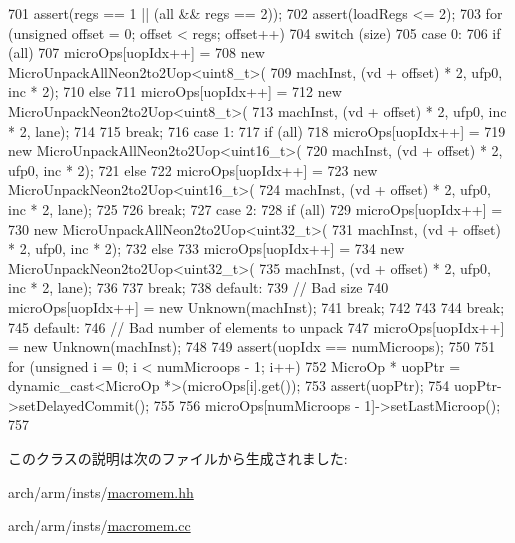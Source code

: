 \begin{DoxyCode}
{{701         assert(regs == 1 || (all && regs == 2));
702         assert(loadRegs <= 2);
703         for (unsigned offset = 0; offset < regs; offset++) {
704             switch (size) {
705               case 0:
706                 if (all) {
707                     microOps[uopIdx++] =
708                         new MicroUnpackAllNeon2to2Uop<uint8_t>(
709                             machInst, (vd + offset) * 2, ufp0, inc * 2);
710                 } else {
711                     microOps[uopIdx++] =
712                         new MicroUnpackNeon2to2Uop<uint8_t>(
713                             machInst, (vd + offset) * 2, ufp0, inc * 2, lane);
714                 }
715                 break;
716               case 1:
717                 if (all) {
718                     microOps[uopIdx++] =
719                         new MicroUnpackAllNeon2to2Uop<uint16_t>(
720                             machInst, (vd + offset) * 2, ufp0, inc * 2);
721                 } else {
722                     microOps[uopIdx++] =
723                         new MicroUnpackNeon2to2Uop<uint16_t>(
724                             machInst, (vd + offset) * 2, ufp0, inc * 2, lane);
725                 }
726                 break;
727               case 2:
728                 if (all) {
729                     microOps[uopIdx++] =
730                         new MicroUnpackAllNeon2to2Uop<uint32_t>(
731                             machInst, (vd + offset) * 2, ufp0, inc * 2);
732                 } else {
733                     microOps[uopIdx++] =
734                         new MicroUnpackNeon2to2Uop<uint32_t>(
735                             machInst, (vd + offset) * 2, ufp0, inc * 2, lane);
736                 }
737                 break;
738               default:
739                 // Bad size
740                 microOps[uopIdx++] = new Unknown(machInst);
741                 break;
742             }
743         }
744         break;
745       default:
746         // Bad number of elements to unpack
747         microOps[uopIdx++] = new Unknown(machInst);
748     }
749     assert(uopIdx == numMicroops);
750 
751     for (unsigned i = 0; i < numMicroops - 1; i++) {
752         MicroOp * uopPtr = dynamic_cast<MicroOp *>(microOps[i].get());
753         assert(uopPtr);
754         uopPtr->setDelayedCommit();
755     }
756     microOps[numMicroops - 1]->setLastMicroop();
757 }

\end{DoxyCode}


このクラスの説明は次のファイルから生成されました:\begin{DoxyCompactItemize}
\item 
arch/arm/insts/\hyperlink{macromem_8hh}{macromem.hh}\item 
arch/arm/insts/\hyperlink{macromem_8cc}{macromem.cc}\end{DoxyCompactItemize}
